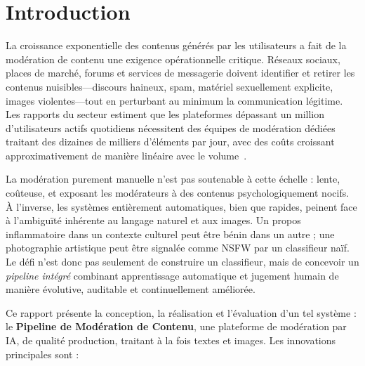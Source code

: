 \chapter{Introduction}
\label{ch:introduction}

La croissance exponentielle des contenus générés par les utilisateurs a fait de la modération de contenu une exigence opérationnelle critique. Réseaux sociaux, places de marché, forums et services de messagerie doivent identifier et retirer les contenus nuisibles---discours haineux, spam, matériel sexuellement explicite, images violentes---tout en perturbant au minimum la communication légitime. Les rapports du secteur estiment que les plateformes dépassant un million d'utilisateurs actifs quotidiens nécessitent des équipes de modération dédiées traitant des dizaines de milliers d'éléments par jour, avec des coûts croissant approximativement de manière linéaire avec le volume~\cite{gillespie2018curation}.

La modération purement manuelle n'est pas soutenable à cette échelle : lente, coûteuse, et exposant les modérateurs à des contenus psychologiquement nocifs. À l'inverse, les systèmes entièrement automatiques, bien que rapides, peinent face à l'ambiguïté inhérente au langage naturel et aux images. Un propos inflammatoire dans un contexte culturel peut être bénin dans un autre ; une photographie artistique peut être signalée comme NSFW par un classifieur naïf. Le défi n'est donc pas seulement de construire un classifieur, mais de concevoir un \emph{pipeline intégré} combinant apprentissage automatique et jugement humain de manière évolutive, auditable et continuellement améliorée.

Ce rapport présente la conception, la réalisation et l'évaluation d'un tel système : le \textbf{Pipeline de Modération de Contenu}, une plateforme de modération par IA, de qualité production, traitant à la fois textes et images. Les innovations principales sont :

